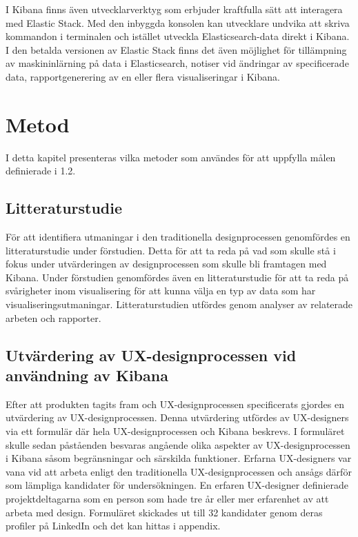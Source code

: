 \documentclass{kththesis}
\begin{document}
I Kibana finns även utvecklarverktyg som erbjuder kraftfulla sätt att interagera med Elastic Stack. Med den inbyggda konsolen kan utvecklare undvika att skriva kommandon i terminalen och istället utveckla Elasticsearch-data direkt i Kibana. I den betalda versionen av Elastic Stack finns det även möjlighet för tillämpning av maskininlärning på data i Elasticsearch, notiser vid ändringar av specificerade data, rapportgenerering av en eller flera visualiseringar i Kibana.


\chapter{Metod}

I detta kapitel presenteras vilka metoder som användes för att uppfylla målen definierade i 1.2.

\section{Litteraturstudie}

För att identifiera utmaningar i den traditionella designprocessen genomfördes en litteraturstudie under förstudien. Detta för att ta reda på vad som skulle stå i fokus under utvärderingen av designprocessen som skulle bli framtagen med Kibana. Under förstudien genomfördes även en litteraturstudie för att ta reda på svårigheter inom visualisering för att kunna välja en typ av data som har visualiseringsutmaningar. Litteraturstudien utfördes genom analyser av relaterade arbeten och rapporter.

\section{Utvärdering av UX-designprocessen vid användning av Kibana}

Efter att produkten tagits fram och UX-designprocessen specificerats gjordes en utvärdering av UX-designprocessen. Denna utvärdering utfördes av UX-designers via ett formulär där hela UX-designprocessen och Kibana beskrevs. I formuläret skulle sedan påståenden besvaras angående olika aspekter av UX-designprocessen i Kibana såsom begränsningar och särskilda funktioner. Erfarna UX-designers var vana vid att arbeta enligt den traditionella UX-designprocessen och ansågs därför som lämpliga kandidater för undersökningen. En erfaren UX-designer definierade projektdeltagarna som en person som hade tre år eller mer erfarenhet av att arbeta med design. Formuläret skickades ut till 32 kandidater genom deras profiler på LinkedIn och det kan hittas i appendix.
\end{document}
